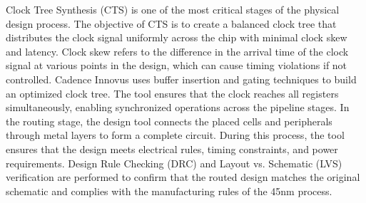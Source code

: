 Clock Tree Synthesis (CTS) is one of the most critical stages of the physical design process. The objective of CTS is to create a balanced clock tree that distributes the clock signal uniformly across the chip with minimal clock skew and latency. Clock skew refers to the difference in the arrival time of the clock signal at various points in the design, which can cause timing violations if not controlled. Cadence Innovus uses buffer insertion and gating techniques to build an optimized clock tree. The tool ensures that the clock reaches all registers simultaneously, enabling synchronized operations across the pipeline stages. In the routing stage, the design tool connects the placed cells and peripherals through metal layers to form a complete circuit. During this process, the tool ensures that the design meets electrical rules, timing constraints, and power requirements. Design Rule Checking (DRC) and Layout vs. Schematic (LVS) verification are performed to confirm that the routed design matches the original schematic and complies with the manufacturing rules of the 45nm process.

